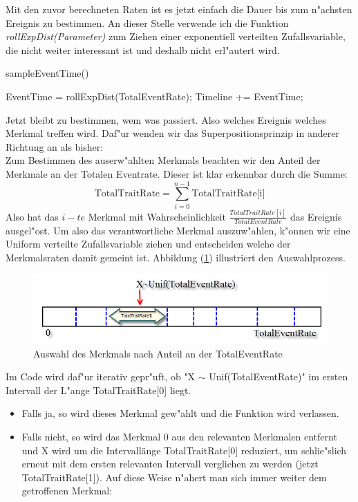 \documentclass[11pt, a4paper, german]{article}
\theoremstyle{plain}
\begin{document}
	Mit den zuvor berechneten Raten ist es jetzt einfach die Dauer bis zum n"achsten Ereignis zu bestimmen. An dieser Stelle verwende ich die Funktion \textit{rollExpDist(Parameter)} zum Ziehen einer exponentiell verteilten Zufallsvariable, die nicht weiter interessant ist und deshalb nicht erl"autert wird.
 	\begin{algorithm}[H]
 		\caption{sampleEventTime()}
 		\begin{algorithmic}[1]
 			\State EventTime = rollExpDist(TotalEventRate);
 			\State Timeline += EventTime;
 		\end{algorithmic}
 	\end{algorithm}
 	Jetzt bleibt zu bestimmen, wem was passiert. Also welches Ereignis welches Merkmal treffen wird. Daf"ur wenden wir das Superpositionsprinzip in anderer Richtung an als bisher:\\
 	Zum Bestimmen des auserw"ahlten Merkmals beachten wir den Anteil der Merkmale an der Totalen Eventrate. Dieser ist klar erkennbar durch die Summe:
 	\[ \text{TotalTraitRate} = \sum_{i = 0}^{n - 1} \text{TotalTraitRate[i]} \]
 	Also hat das $ i-te $ Merkmal mit Wahrscheinlichkeit $ \frac{TotalTraitRate[i]}{TotalEventRate} $ das Ereignis ausgel"ost. Um also das verantwortliche Merkmal auszuw"ahlen, k"onnen wir eine Uniform verteilte Zufallsvariable ziehen und entscheiden welche der Merkmalsraten damit gemeint ist. Abbildung (\ref{SelectTrait}) illustriert den Auswahlprozess.
 	\begin{figure}[H]
		\centering
		\includegraphics[width=1\linewidth]{./Pictures/SelectTrait}
		\caption[]{Auswahl des Merkmals nach Anteil an der TotalEventRate}
		\label{SelectTrait}
	\end{figure}
	Im Code wird daf"ur iterativ gepr"uft, ob "{}X $ \sim $ Unif(TotalEventRate)"{} im ersten Intervall der L"ange TotalTraitRate[0] liegt. 
	\begin{itemize}
		\item[] Falls ja, so wird dieses Merkmal gew"ahlt und die Funktion wird verlassen.
		\item[] Falls nicht, so wird das Merkmal $ 0 $ aus den relevanten Merkmalen entfernt und X wird um die Intervallänge TotalTraitRate[0] reduziert, um schlie"slich erneut mit dem ersten relevanten Intervall verglichen zu werden (jetzt TotalTraitRate[1]). Auf diese Weise n"ahert man sich immer weiter dem getroffenen Merkmal:
	\end{itemize}
\end{document}
